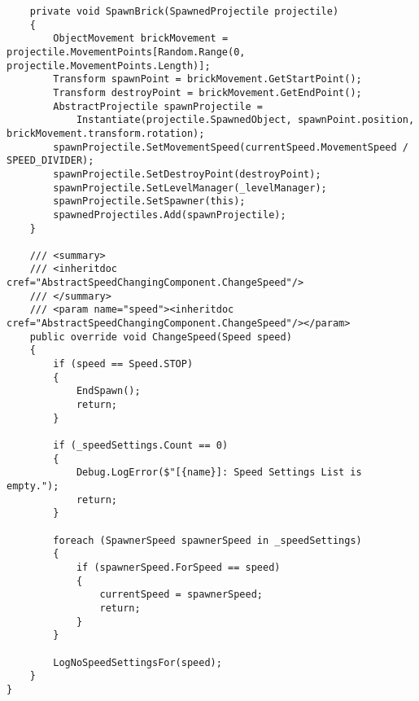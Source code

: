 \begin{verbatim}
    private void SpawnBrick(SpawnedProjectile projectile)
    {
        ObjectMovement brickMovement = projectile.MovementPoints[Random.Range(0, projectile.MovementPoints.Length)];
        Transform spawnPoint = brickMovement.GetStartPoint();
        Transform destroyPoint = brickMovement.GetEndPoint();
        AbstractProjectile spawnProjectile =
            Instantiate(projectile.SpawnedObject, spawnPoint.position, brickMovement.transform.rotation);
        spawnProjectile.SetMovementSpeed(currentSpeed.MovementSpeed / SPEED_DIVIDER);
        spawnProjectile.SetDestroyPoint(destroyPoint);
        spawnProjectile.SetLevelManager(_levelManager);
        spawnProjectile.SetSpawner(this);
        spawnedProjectiles.Add(spawnProjectile);
    }

    /// <summary>
    /// <inheritdoc cref="AbstractSpeedChangingComponent.ChangeSpeed"/>
    /// </summary>
    /// <param name="speed"><inheritdoc cref="AbstractSpeedChangingComponent.ChangeSpeed"/></param>
    public override void ChangeSpeed(Speed speed)
    {
        if (speed == Speed.STOP)
        {
            EndSpawn();
            return;
        }

        if (_speedSettings.Count == 0)
        {
            Debug.LogError($"[{name}]: Speed Settings List is empty.");
            return;
        }

        foreach (SpawnerSpeed spawnerSpeed in _speedSettings)
        {
            if (spawnerSpeed.ForSpeed == speed)
            {
                currentSpeed = spawnerSpeed;
                return;
            }
        }

        LogNoSpeedSettingsFor(speed);
    }
}
\end{verbatim}
